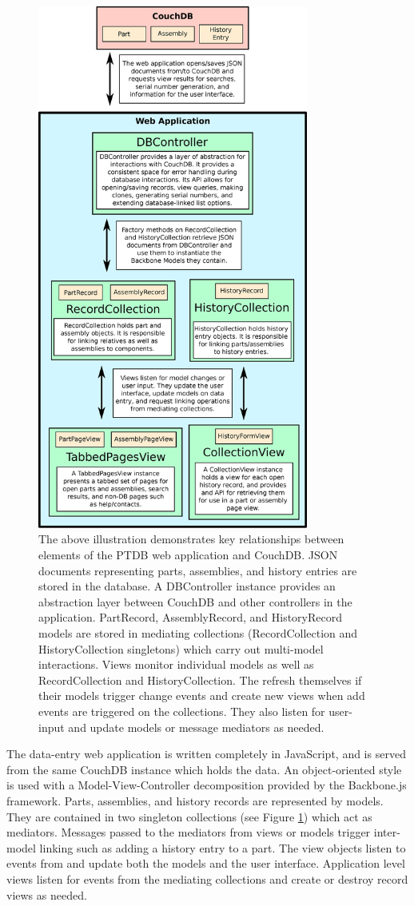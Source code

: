\documentclass[journal]{IEEEtran}
\begin{document}
\begin{figure}[!t]
\centering
\includegraphics[width=3.5in]{simple_structure}
\caption{The above illustration demonstrates key relationships between elements of the PTDB web application
and CouchDB. JSON documents representing parts, assemblies, and history entries are stored in the database.
A DBController instance provides an abstraction layer between CouchDB and other controllers in the application.
PartRecord, AssemblyRecord, and HistoryRecord models are stored in mediating collections (RecordCollection and HistoryCollection
singletons) which carry out multi-model interactions. Views monitor individual models as well as RecordCollection and HistoryCollection.
The refresh themselves if their models trigger change events and create new views when add events are triggered
on the collections. They also listen for user-input and update models or message mediators as needed.}
\label{simple_structure}
\end{figure}

The data-entry web application is written completely in JavaScript, and is served from the same CouchDB instance
which holds the data. An object-oriented style is used with a Model-View-Controller decomposition provided
by the Backbone.js framework. Parts, assemblies, and history records are represented by models. They are contained
in two singleton collections (see Figure \ref{simple_structure}) which act as mediators. Messages passed to 
the mediators from views or models trigger inter-model linking such as adding a history entry to a part.
The view objects listen to events from and update both the models and the user interface. Application level
views listen for events from the mediating collections and create or destroy record views as needed. 
\end{document}
